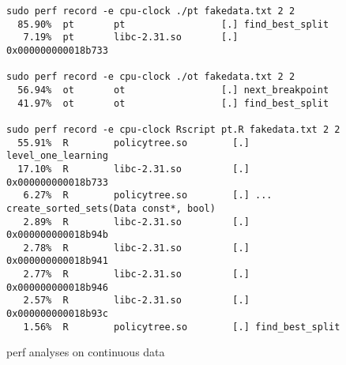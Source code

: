 \documentclass{article}
\begin{document}
\begin{figure}
  \centering
\begin{verbatim}
sudo perf record -e cpu-clock ./pt fakedata.txt 2 2
  85.90%  pt       pt                 [.] find_best_split
   7.19%  pt       libc-2.31.so       [.] 0x000000000018b733

sudo perf record -e cpu-clock ./ot fakedata.txt 2 2
  56.94%  ot       ot                 [.] next_breakpoint
  41.97%  ot       ot                 [.] find_best_split

sudo perf record -e cpu-clock Rscript pt.R fakedata.txt 2 2
  55.91%  R        policytree.so        [.] level_one_learning
  17.10%  R        libc-2.31.so         [.] 0x000000000018b733
   6.27%  R        policytree.so        [.] ... create_sorted_sets(Data const*, bool)
   2.89%  R        libc-2.31.so         [.] 0x000000000018b94b
   2.78%  R        libc-2.31.so         [.] 0x000000000018b941
   2.77%  R        libc-2.31.so         [.] 0x000000000018b946
   2.57%  R        libc-2.31.so         [.] 0x000000000018b93c
   1.56%  R        policytree.so        [.] find_best_split
\end{verbatim}
  \caption{perf analyses on continuous data}
  \label{fig:perfcontinuous}
\end{figure}



\end{document}
